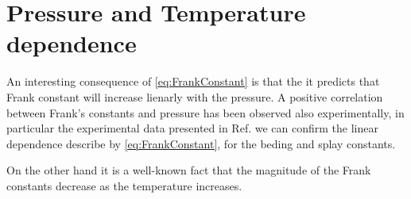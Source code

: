 \documentclass[%
 aip,
 amsmath,amssymb,
 reprint,%
]{revtex4-1}
\begin{document}
\section{Pressure and Temperature dependence}
An interesting consequence of \eqref{eq:FrankConstant} is that the it predicts that Frank constant will increase lienarly with the pressure. A positive correlation between Frank's constants and pressure has been observed also experimentally\cite{SBF87}, in particular the experimental data presented in Ref. \cite{PRPH12} we can confirm the linear dependence describe by \eqref{eq:FrankConstant}, for the beding and splay constants.

On the other hand it is a well-known fact that the magnitude of the Frank constants decrease as the temperature increases\cite{dGJ,G73}.

\end{document}
